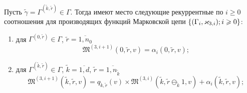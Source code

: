 \documentclass{report}
\newcommand{\MarkThree}{\{(\Gamma_i, \varkappa_{3,i}); \hm{} i \geqslant 0\}}
\begin{document}
\begin{theorem}
Пусть $\tilde{\gamma}=\Gamma^{(\tilde{k},\tilde{r})} \in \Gamma$. Тогда имеют место следующие рекуррентные по $i \geqslant 0$ соотношения для производящих функций Марковской цепи $\MarkThree$:
\begin{enumerate}
\item для $ \Gamma^{(0,\tilde{r})} \in \Gamma$, $\tilde{r} = \overline{1,n_0}$ 
\begin{equation}
\mathfrak{M}^{(3,i+1)}(0,\tilde{r},v) = \alpha_i(0,\tilde{r},v);
\label{three:generation:rek:one}
\end{equation}
\item для $\Gamma^{(\tilde{k},\tilde{r})} \in \Gamma $, $\tilde{k} =\overline{1,d}$, $\tilde{r}=\overline{1,n_{\tilde{k}}}$
\begin{equation}
\mathfrak{M}^{(3,i+1)}(\tilde{k},\tilde{r},v) = q_{\tilde{k},\tilde{r}} (v)\times  \mathfrak{M}^{(3,i)}(\tilde{k},\tilde{r} \ominus_{\tilde{k}} 1,v) + \alpha_i(\tilde{k},\tilde{r},v);
\label{three:generation:rek:two}
\end{equation}
\end{enumerate}

\label{theorem:gen:rek}
\end{theorem}
\end{document}
